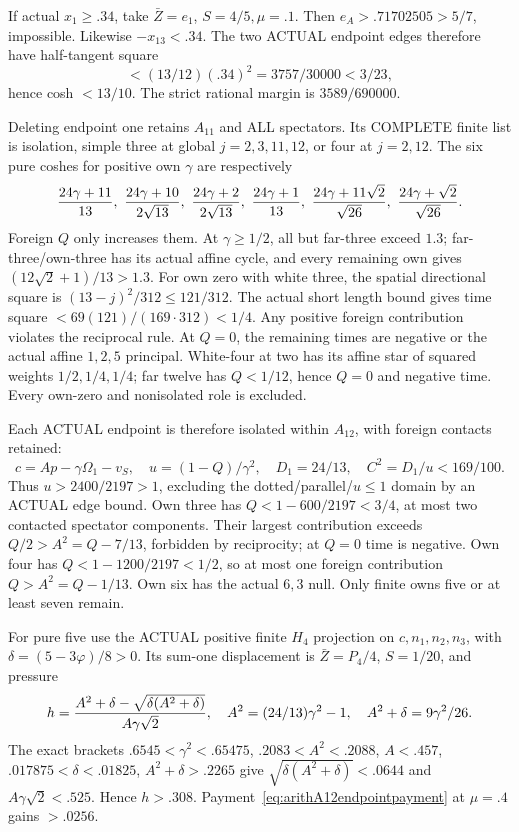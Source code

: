 If actual \(x_1\ge.34\), take \(\bar Z=e_1\),
\(S=4/5,\mu=.1\).
Then \(e_A>.71702505>5/7\), impossible.
Likewise \(-x_{13}<.34\).
The two ACTUAL endpoint edges therefore have
half-tangent square
\[
                 <(13/12)(.34)^2=3757/30000<3/23 ,
\]
hence cosh \(<13/10\).
The strict rational margin is \(3589/690000\).

Deleting endpoint one retains \(A_{11}\) and
ALL spectators.
Its COMPLETE finite list is isolation, simple
three at global \(j=2,3,11,12\), or four at
\(j=2,12\).
The six pure coshes for positive own \(\gamma\)
are respectively
\[
 {24\gamma+11\over13},\
 {24\gamma+10\over2\sqrt{13}},\
 {24\gamma+2\over2\sqrt{13}},\
 {24\gamma+1\over13},\
 {24\gamma+11\sqrt2\over\sqrt{26}},\
 {24\gamma+\sqrt2\over\sqrt{26}} .
\]
Foreign \(Q\) only increases them.
At \(\gamma\ge1/2\), all but far-three exceed
\(1.3\); far-three/own-three has its actual
affine cycle, and every remaining own gives
\((12\sqrt2+1)/13>1.3\).
For own zero with white three, the spatial
directional square is \((13-j)^2/312\le121/312\).
The actual short length bound gives time square
\(<69(121)/(169\cdot312)<1/4\).
Any positive foreign contribution violates
the reciprocal rule.
At \(Q=0\), the remaining times are negative
or the actual affine \(1,2,5\) principal.
White-four at two has its affine star of
squared weights \(1/2,1/4,1/4\);
far twelve has \(Q<1/12\), hence \(Q=0\)
and negative time.
Every own-zero and nonisolated role is excluded.

Each ACTUAL endpoint is therefore isolated
within \(A_{12}\), with foreign contacts retained:
\[
 c=Ap-\gamma\Omega_1-v_S,\quad
 u=(1-Q)/\gamma^2,\quad D_1=24/13,\quad
 C^2=D_1/u<169/100 .
\]
Thus \(u>2400/2197>1\), excluding the
dotted/parallel/\(u\le1\) domain by an ACTUAL
edge bound.
Own three has \(Q<1-600/2197<3/4\),
at most two contacted spectator components.
Their largest contribution exceeds
\(Q/2>A^2=Q-7/13\), forbidden by reciprocity;
at \(Q=0\) time is negative.
Own four has \(Q<1-1200/2197<1/2\),
so at most one foreign contribution
\(Q>A^2=Q-1/13\).
Own six has the actual \(6,3\) null.
Only finite owns five or at least seven remain.

For pure five use the ACTUAL positive finite
\(H_4\) projection on \(c,n_1,n_2,n_3\),
with \(\delta=(5-3\varphi)/8>0\).
Its sum-one displacement is \(\bar Z=P_4/4\),
\(S=1/20\), and pressure
\[
 h={A^2+\delta-\sqrt{\delta(A^2+\delta)}
                    \over A\gamma\sqrt2},\quad
 A^2=(24/13)\gamma^2-1,\quad
 A^2+\delta=9\gamma^2/26 .
\]
The exact brackets
\(.6545<\gamma^2<.65475\),
\(.2083<A^2<.2088\), \(A<.457\),
\(.017875<\delta<.01825\),
\(A^2+\delta>.2265\)
give \(\sqrt{\delta(A^2+\delta)}<.0644\)
and \(A\gamma\sqrt2<.525\).
Hence \(h>.308\).
Payment~\eqref{eq:arithA12endpointpayment}
at \(\mu=.4\) gains \(>.0256\).


